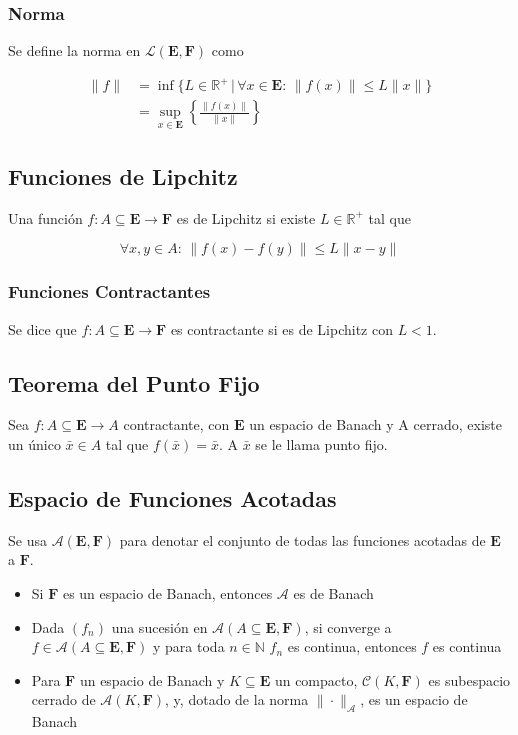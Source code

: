 \subsubsection{Norma}

Se define la norma en $\mathcal{L}(\mathbf{E},\mathbf{F})$ como

\begin{equation}
\begin{split}
\|f\| &= \inf\{L\in\mathbb{R}^+\,|\,\forall x\in
\mathbf{E}:\,\|f(x)\|\leq L\|x\|\}\\
&= \sup_{x\in\mathbf{E}}\left\{\frac{\|f(x)\|}{\|x\|}\right\}
\end{split}
\nonumber
\end{equation}

\subsection{Funciones de Lipchitz}

Una función $f:A\subseteq\mathbf{E}\to\mathbf{F}$ es de Lipchitz si existe $L\in\mathbb{R}^+$ tal que

\[\forall x,y\in A:\, \|f(x)-f(y)\|\leq L\|x-y\|\]

\subsubsection{Funciones Contractantes}

Se dice que $f:A\subseteq\mathbf{E}\to\mathbf{F}$ es contractante si es de Lipchitz con $L<1$.

\subsection{Teorema del Punto Fijo}
\label{T:.PuntoFijo}

Sea $f:A\subseteq\mathbf{E}\to A$ contractante, con $\mathbf{E}$ un espacio de Banach y A cerrado, existe un único $\bar{x}\in A$ tal que $f(\bar{x})=\bar{x}$. A $\bar{x}$ se le llama punto fijo.

\subsection{Espacio de Funciones Acotadas}

Se usa $\mathcal{A}(\mathbf{E},\mathbf{F})$ para denotar el conjunto de todas las funciones acotadas de $\mathbf{E}$ a $\mathbf{F}$.

\begin{itemize}
    \item Si $\mathbf{F}$ es un espacio de Banach, entonces $\mathcal{A}$ es de Banach
    \item Dada $(f_n)$ una sucesión en $\mathcal{A}(A\subseteq\mathbf{E},\mathbf{F})$, si converge a $f\in\mathcal{A}(A\subseteq\mathbf{E},\mathbf{F})$ y para toda $n\in\mathbb{N}$ $f_n$ es continua, entonces $f$ es continua
    \item Para $\mathbf{F}$ un espacio de Banach y $K\subseteq\mathbf{E}$ un compacto, $\mathcal{C}(K,\mathbf{F})$ es subespacio cerrado de $\mathcal{A}(K,\mathbf{F})$, y, dotado de la norma $\|\cdot\|_{\mathcal{A}}$, es un espacio de Banach
\end{itemize}


